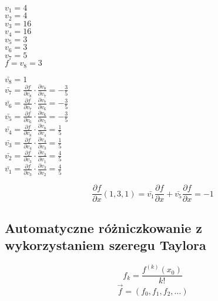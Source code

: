\documentclass[../mn-notatki.tex]{subfiles}
\begin{document}
\begin{minipage}{.5\textwidth}
\begin{center}
        $v_1 = 4$\\
        $v_2 = 4$\\
        $v_3 = 16$\\
        $v_4 = 16$\\
        $v_5 = 3$\\
        $v_6 = 3$\\
        $v_7 = 5$\\
        $f = v_8 = 3$
\end{center}
\end{minipage}%
\begin{minipage}{.5\textwidth}
\begin{center}
        $\bar{v_8} = 1$\\
        $\bar{v_7} = \frac{\partial f}{\partial v_8} \cdot \frac{\partial v_8}{\partial v_7} = -\frac{3}{5}$\\
        $\bar{v_6} = \frac{\partial f}{\partial v_7} \cdot \frac{\partial v_7}{\partial v_6} = -\frac{3}{5}$\\
        $\bar{v_5} = \frac{\partial f}{\partial v_6} \cdot \frac{\partial v_6}{\partial v_5} = -\frac{3}{5}$\\
        $\bar{v_4} = \frac{\partial f}{\partial v_8} \cdot \frac{\partial v_8}{\partial v_4} = \frac{1}{5}$\\
        $\bar{v_3} = \frac{\partial f}{\partial v_4} \cdot \frac{\partial v_4}{\partial v_3} = \frac{1}{5}$\\
        $\bar{v_2} = \frac{\partial f}{\partial v_3} \cdot \frac{\partial v_3}{\partial v_1} = \frac{4}{5}$\\
        $\bar{v_1} = \frac{\partial f}{\partial v_3} \cdot \frac{\partial v_3}{\partial v_2} = \frac{4}{5}$
\end{center}
\end{minipage}
\[
\frac{\partial f}{\partial x}(1,3,1) = \bar{v_1} \frac{\partial f}{\partial x}
+ \bar{v_5}\frac{\partial f}{\partial x} = -1
\]

\subsection{Automatyczne różniczkowanie z wykorzystaniem szeregu Taylora}
\begin{tcolorbox}
\[
f_k = \frac{f^{(k)}(x_0)}{k!}
\]
\[
\vec{f} = (f_0, f_1, f_2, \ldots)
\]
\end{tcolorbox}
\end{document}
